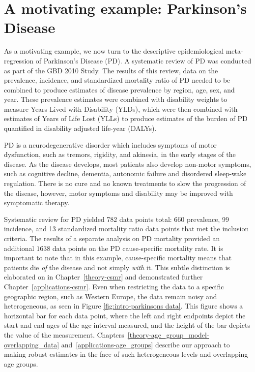 \section{A motivating example: Parkinson's Disease}
\label{intro-complete_ex}

As a motivating example, we now turn to the descriptive
epidemiological meta-regression of Parkinson's Disease (PD). A
systematic review of PD was conducted as part of the GBD 2010
Study.\cite{GBD_2010_or_parkinsons_paper} The results of this review,
data on the prevalence, incidence, and standardized mortality ratio of PD
needed to be combined to produce estimates of disease prevalence by
region, age, sex, and year.  These prevalence estimates were combined
with disability weights to measure Years Lived with Disability (YLDs),
which were then combined with estimates of Years of Life Lost (YLLs)
to produce estimates of the burden of PD quantified in disability
adjusted life-year (DALYs).

PD is a neurodegenerative disorder which includes symptoms of motor
dysfunction, such as tremors, rigidity, and akinesia, in the early
stages of the disease.  As the disease develops, most patients also
develop non-motor symptoms, such as cognitive decline, dementia,
autonomic failure and disordered sleep-wake regulation.  There is no
cure and no known treatments to slow the progression of the disease,
however, motor symptoms and disability may be improved with
symptomatic therapy.\cite{poewe_natural_2006, pollock_prevalence_1966}

Systematic review for PD yielded 782 data points total: 660
prevalence, 99 incidence, and 13 standardized mortality ratio data
points that met the inclusion criteria.  The results of a separate
analysis on PD mortality provided an additional $1638$ data points on
the PD cause-specific mortality rate. It is important to note that in
this example, cause-specific mortality means that patients die
\emph{of} the disease and not simply \emph{with} it.  This subtle
distinction is elaborated on in Chapter~\ref{theory-csmr} and
demonstrated further Chapter~\ref{applications-csmr}.  Even when
restricting the data to a specific geographic region, such as Western
Europe, the data remain noisy and heterogeneous, as seen in Figure
\ref{fig:intro-parkinsons data}. This figure shows a horizontal bar
for each data point, where the left and right endpoints depict the
start and end ages of the age interval measured, and the height of the
bar depicts the value of the
measurement. Chapters~\ref{theory-age_group_model-overlapping_data}
and~\ref{applications-age_groups} describe our approach to making
robust estimates in the face of such heterogeneous levels and
overlapping age groups.

